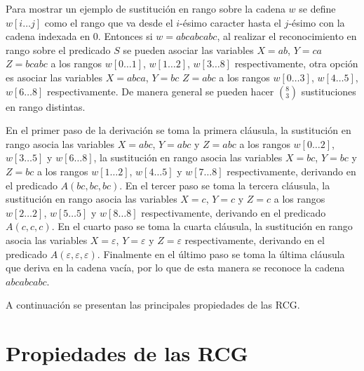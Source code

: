 \documentclass[12pt]{article}
\begin{document}
Para mostrar un ejemplo de sustitución en rango sobre la cadena $w$ se define $w[i\dots j]$ como
el rango que va desde el $i$-ésimo caracter hasta el $j$-ésimo con la cadena indexada en 0. Entonces
si $w=abcabcabc$, al realizar el reconocimiento en rango sobre el predicado $S$ se pueden asociar
las variables $X=ab$, $Y=ca$ $Z=bcabc$ a los rangos $w[0\dots 1]$, $w[1\dots 2]$, $w[3\dots 8]$ respectivamente, otra
opción es asociar las variables $X=abca$, $Y=bc$ $Z=abc$ a los rangos $w[0\dots 3]$, $w[4\dots 5]$, $w[6\dots 8]$ respectivamente. De manera
general se pueden hacer $(^8_3)$ sustituciones en rango distintas.

En el primer paso de la derivación se toma la primera cláusula, la sustitución en rango asocia las variables $X=abc$, $Y=abc$ y $Z=abc$
a los rangos $w[0\dots 2]$, $w[3\dots 5]$ y $w[6\dots 8]$, la sustitución en rango asocia las variables $X=bc$, $Y=bc$ y $Z=bc$ a los rangos $w[1\dots 2]$, $w[4\dots 5]$ y $w[7\dots 8]$
respectivamente, derivando en el predicado $A(bc,bc,bc)$. En el tercer paso se toma la tercera cláusula,
la sustitución en rango asocia las variables $X=c$, $Y=c$ y $Z=c$ a los rangos $w[2\dots 2]$, $w[5\dots 5]$ y
$w[8\dots 8]$ respectivamente, derivando en el predicado $A(c,c,c)$.
En el cuarto paso se toma la cuarta cláusula, la sustitución en rango asocia las variables
$X=\varepsilon$, $Y=\varepsilon$ y $Z=\varepsilon$ respectivamente, derivando en el predicado
$A(\varepsilon,\varepsilon,\varepsilon)$. Finalmente en el  último paso se toma la última cláusula
que deriva en la cadena vacía, por lo que de esta manera se reconoce la cadena $abcabcabc$.

A continuación se presentan las principales propiedades de las RCG.
\section{Propiedades de las RCG}
\end{document}
